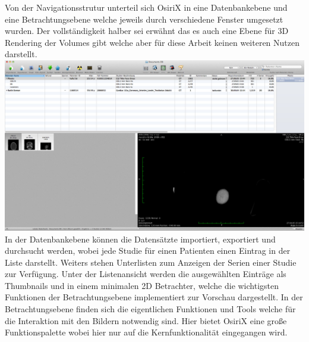 Von der Navigationsstrutur unterteil sich OsiriX in eine Datenbankebene und eine Betrachtungsebene welche jeweils durch verschiedene Fenster umgesetzt wurden.
Der vollständigkeit halber sei erwähnt das es auch eine Ebene für 3D Rendering der Volumes gibt welche aber für diese Arbeit keinen weiteren Nutzen darstellt.
\includegraphics[width=\linewidth]{img/c1_osirix_db_view.jpg}
In der Datenbankebene können die Datensätzte importiert, exportiert und durchsucht werden, wobei jede Studie für einen Patienten einen Eintrag in der Liste darstellt.
Weiters stehen Unterlisten zum Anzeigen der Serien einer Studie zur Verfügung.
Unter der Listenansicht werden die ausgewählten Einträge als Thumbnails und in einem minimalen 2D Betrachter,
welche die wichtigsten Funktionen der Betrachtungsebene implementiert zur Vorschau dargestellt.
In der Betrachtungsebene finden sich die eigentlichen Funktionen und Tools welche für die Interaktion mit den Bildern notwendig sind.
Hier bietet OsiriX eine große Funktionspalette wobei hier nur auf die Kernfunktionalität eingegangen wird.

